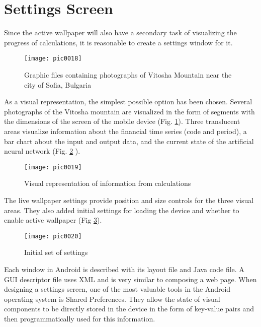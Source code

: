 \section{Settings Screen}

Since the active wallpaper will also have a secondary task of visualizing the progress of calculations, it is reasonable to create a settings window for it.

\begin{figure}[h]
\centering
\texttt{[image: pic0018]}
\caption{Graphic files containing photographs of Vitosha Mountain near the city of Sofia, Bulgaria}
\label{fig:pic0018}
\end{figure}
\FloatBarrier

As a visual representation, the simplest possible option has been chosen. Several photographs of the Vitosha mountain are visualized in the form of segments with the dimensions of the screen of the mobile device (Fig. \ref{fig:pic0018}). Three translucent areas visualize information about the financial time series (code and period), a bar chart about the input and output data, and the current state of the artificial neural network (Fig. \ref{fig:pic0019} ).

\begin{figure}[h]
\centering
\texttt{[image: pic0019]}
\caption{Visual representation of information from calculations}
\label{fig:pic0019}
\end{figure}
\FloatBarrier

The live wallpaper settings provide position and size controls for the three visual areas. They also added initial settings for loading the device and whether to enable active wallpaper (Fig \ref{fig:pic0020}).

\begin{figure}[h]
\centering
\texttt{[image: pic0020]}
\caption{Initial set of settings}
\label{fig:pic0020}
\end{figure}
\FloatBarrier

Each window in Android is described with its layout file and Java code file. A GUI descriptor file uses XML and is very similar to composing a web page. When designing a settings screen, one of the most valuable tools in the Android operating system is Shared Preferences. They allow the state of visual components to be directly stored in the device in the form of key-value pairs and then programmatically used for this information.

